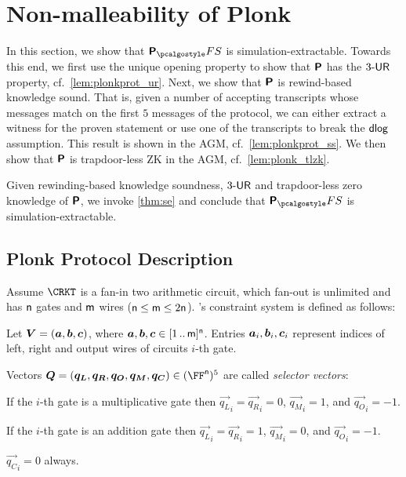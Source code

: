 
\section{Non-malleability of Plonk} 
\label{sec:plonk}
In this section, we show that $\plonkprotfs$ is simulation-extractable. Towards this end, we first use the unique opening property to show that
$\bm{\mathsf{P}}$ has the ${3\text{-}\mathsf{UR}}$ property,
cf.~\cref{lem:plonkprot_ur}.
Next, we show that $\bm{\mathsf{P}}$ is rewind-based knowledge sound. That is, given a number of accepting transcripts whose messages match on the first $5$ messages of the protocol, we can either extract a witness for the proven statement or use one of the transcripts to break the $\mathsf{dlog}$ assumption. This result is shown in the AGM, cf.~\cref{lem:plonkprot_ss}. We then show that $\bm{\mathsf{P}}$ is trapdoor-less ZK in the AGM, cf.~\cref{lem:plonk_tlzk}.

Given rewinding-based knowledge soundness, ${3\text{-}\mathsf{UR}}$ and trapdoor-less zero knowledge of $\bm{\mathsf{P}}$, we invoke \cref{thm:se} and conclude that $\plonkprot_\fs$ is simulation-extractable.

\newcommand{\vql}{\vec{q_{L}}}
\newcommand{\vqr}{\vec{q_{R}}}
\newcommand{\vqm}{\vec{q_{M}}}
\newcommand{\vqo}{\vec{q_{O}}}
\newcommand{\vx}{\vec{x}}
\newcommand{\vqc}{\vec{q_{C}}}

\subsection{Plonk Protocol Description}
\label{sec:plonk_explained}
Assume $\CRKT$ is a fan-in two arithmetic circuit,
which fan-out is unlimited and has $\mathsf{n}$ gates and $\mathsf{m}$ wires
($\mathsf{n} \leq \mathsf{m} \leq 2\mathsf{n}$). \plonk's constraint
system is defined as follows:
\begin{compactitem}
\item Let $\vec{V} = (\va, \vb, \vc)$, where $\va, \vb, \vc
  \in \range{1}{\noofw}^\numberofconstrains$. Entries $\va_i, \vb_i, \vc_i$ represent indices of left,
  right and output wires of circuits $i$-th gate.
\item Vectors $\vec{Q} = (\vql, \vqr, \vqo, \vqm, \vqc) \in
  (\FF^\numberofconstrains)^5$ are called \emph{selector vectors}:
  \begin{inparaenum}[(a)]
  \item If the $i$-th gate is a multiplicative gate then $\vql_i = \vqr_i = 0$,
    $\vqm_i = 1$, and $\vqo_i = -1$. 
  \item If the $i$-th gate is an addition gate then $\vql_i = \vqr_i  = 1$, $\vqm_i =
    0$, and $\vqo_i = -1$. 
  \item $\vqc_i = 0$ always. 
  \end{inparaenum}
\end{compactitem}

